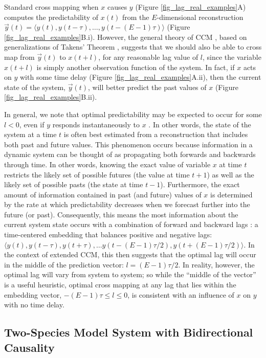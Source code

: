 Standard cross mapping when $x$ causes $y$ (Figure \ref{fig_lag_real_examples}A) computes the predictability of $x(t)$ from the $E$-dimensional reconstruction $\vec{y}(t) = \langle y(t), y(t-\tau), \dots, y(t - (E-1)\tau) \rangle$ (Figure \ref{fig_lag_real_examples}B.i). However, the general theory of CCM \cite{Sugihara_2012}, based on generalizations of Takens' Theorem \cite{Sauer_1991, Deyle_2011}, suggests that we should also be able to cross map from $\vec{y}(t)$ to $x(t+l)$, for any reasonable lag value of $l$, since the variable $x(t+l)$ is simply another observation function of the system. In fact, if $x$ acts on $y$ with some time delay (Figure \ref{fig_lag_real_examples}A.ii), then the current state of the system, $\vec{y}(t)$, will better predict the past values of $x$ (Figure \ref{fig_lag_real_examples}B.ii).

In general, we note that optimal predictability may be expected to occur for some $l < 0$, even if $y$ responds instantaneously to $x$ \cite{Casdagli_1991}. In other words, the state of the system at a time $t$ is often best estimated from a reconstruction that includes both past and future values. This phenomenon occurs because information in a dynamic system can be thought of as propagating both forwards and backwards through time. In other words, knowing the exact value of variable $x$ at time $t$ restricts the likely set of possible futures (the value at time $t+1$) as well as the likely set of possible pasts (the state at time $t-1$). Furthermore, the exact amount of information contained in past (and future) values of $x$ is determined by the rate at which predictability decreases when we forecast further into the future (or past). Consequently, this means the most information about the current system state occurs with a combination of forward and backward lags \cite{Casdagli_1991}: a time-centered embedding that balances positive and negative lags: $\langle y(t), y(t-\tau), y(t+\tau), \dots y(t-(E-1)\tau/2), y(t+(E-1)\tau/2) \rangle$. In the context of extended CCM, this then suggests that the optimal lag will occur in the middle of the prediction vector: $l = (E-1)\tau/2$. In reality, however, the optimal lag will vary from system to system; so while the ``middle of the vector'' is a useful heuristic, optimal cross mapping at any lag that lies within the embedding vector, $-(E-1)\tau \le l \le 0$, is consistent with an influence of $x$ on $y$ with no time delay.

\subsection{Two-Species Model System with Bidirectional Causality}


